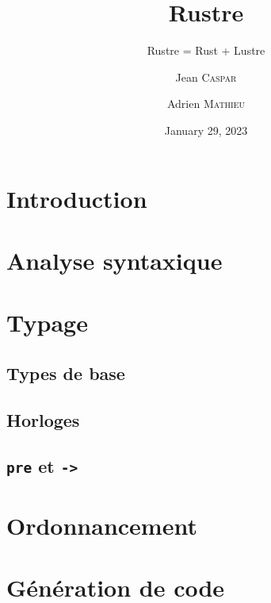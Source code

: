 \documentclass{scrartcl}
\title{Rustre}
\subtitle{Rustre = Rust + Lustre}
\author{Jean \textsc{Caspar} \and Adrien \textsc{Mathieu}}
\date{January 29, 2023}
\begin{document}
\maketitle{}
\tableofcontents

\section*{Introduction}

\section{Analyse syntaxique}

\section{Typage}
\subsection{Types de base}
\subsubsection{}

\subsection{Horloges}

\subsection{\texttt{pre} et \texttt{->}}

\section{Ordonnancement}

\section{Génération de code}

\pagebreak
\appendix
\end{document}
